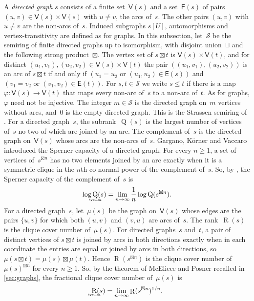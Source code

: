 \documentclass[11pt,letterpaper]{article}
\DeclareMathOperator{\subrank}{Q}
\DeclareMathOperator{\asympsubrank}{\underaccent{\wtilde}{Q}}
\DeclareMathOperator{\asymprank}{\underaccent{\wtilde}{R}}
\DeclareMathOperator{\tensorrank}{R}
\begin{document}
A \emph{directed graph} $s$ consists of a finite set~$\mathsf{V}(s)$ and a set~$\mathsf{E}(s)$ of pairs $(u,v) \in \mathsf{V}(s) \times \mathsf{V}(s)$ with $u \neq v$, the arcs of~$s$. The other pairs $(u,v)$ with $u \neq v$ are the non-arcs of~$s$. Induced subgraphs $s[U]$, automorphisms and vertex-transitivity are defined as for graphs. In this subsection, let~$\mathcal{S}$ be the semiring of finite directed graphs up to isomorphism, with disjoint union~$\sqcup$ and the following strong product~$\boxtimes$. The vertex set of $s \boxtimes t$ is $\mathsf{V}(s) \times \mathsf{V}(t)$, and for distinct $(u_1,v_1), (u_2,v_2) \in \mathsf{V}(s) \times \mathsf{V}(t)$ the pair $((u_1,v_1),(u_2,v_2))$ is an arc of $s \boxtimes t$ if and only if $(u_1 = u_2 \text{ or } (u_1,u_2) \in \mathsf{E}(s))$ and $(v_1 = v_2 \text{ or } (v_1,v_2) \in \mathsf{E}(t))$. For $s, t \in \mathcal{S}$ we write $s \leq t$ if there is a map $\varphi : \mathsf{V}(s) \to \mathsf{V}(t)$ that maps every non-arc of~$s$ to a non-arc of~$t$. As for graphs, $\varphi$ need not be injective. The integer $m \in \mathcal{S}$ is the directed graph on~$m$ vertices without arcs, and~$0$ is the empty directed graph. This is the Strassen semiring of \cite[Example~4.17]{wigderson2022asymptotic}. For a directed graph~$s$, the subrank~$\subrank(s)$ is the largest number of vertices of~$s$ no two of which are joined by an arc. The complement of~$s$ is the directed graph on~$\mathsf{V}(s)$ whose arcs are the non-arcs of~$s$. Gargano, K\"orner and Vaccaro \cite{MR1184988} introduced the Sperner capacity of a directed graph. For every $n \geq 1$, a set of vertices of~$s^{\boxtimes n}$ has no two elements joined by an arc exactly when it is a symmetric clique \cite[Definition~11.16]{MR2839250} in the $n$th co-normal power \cite[Definition~11.17]{MR2839250} of the complement of~$s$. So, by \cite[Definition~11.18]{MR2839250}, the Sperner capacity of the complement of~$s$ is
\[
\log \asympsubrank(s) = \lim_{n \to \infty} \frac{1}{n} \log \subrank(s^{\boxtimes n}).
\]
For a directed graph~$s$, let~$\mu(s)$ be the graph on~$\mathsf{V}(s)$ whose edges are the pairs $\{u,v\}$ for which both $(u,v)$ and $(v,u)$ are arcs of~$s$. The rank~$\tensorrank(s)$ is the clique cover number of~$\mu(s)$. For directed graphs~$s$ and~$t$, a pair of distinct vertices of $s \boxtimes t$ is joined by arcs in both directions exactly when in each coordinate the entries are equal or joined by arcs in both directions, so $\mu(s \boxtimes t) = \mu(s) \boxtimes \mu(t)$. Hence $\tensorrank(s^{\boxtimes n})$ is the clique cover number of~$\mu(s)^{\boxtimes n}$ for every $n \geq 1$. So, by the theorem of McEliece and Posner recalled in \cref{sec:graphs}, the fractional clique cover number of~$\mu(s)$ is
\[
\asymprank(s) = \lim_{n \to \infty} \tensorrank(s^{\boxtimes n})^{1/n}.
\]
\end{document}
